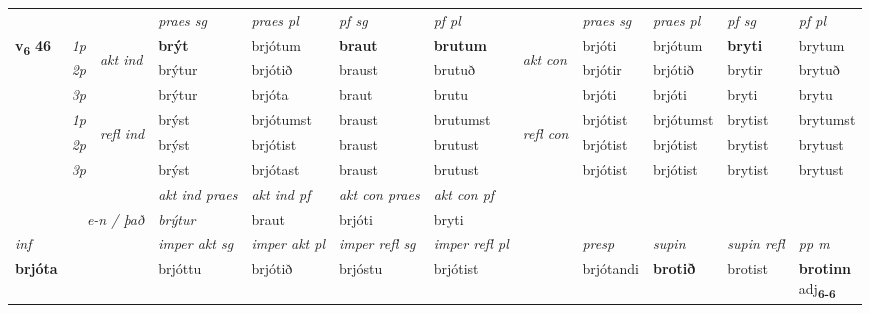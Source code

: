 \begin{longtable}[l]{X>{\footnotesize\itshape}llXXXXlXXXX}
\midrule

 & &   & \textit{praes sg}  & \textit{praes pl}    & \textit{ pf sg} & \textit{pf pl} & & \textit{praes sg}  & \textit{praes pl}    & \textit{pf sg} & \textit{pf pl }  \\ \cmidrule{4-7} \cmidrule{9-12}
 \multirow{2}{*}{{{\textbf{v{\textsubscript{6}}} \Large{\textbf{46}}}}}  & 1p & \multirow{3}{*}{\begin{turn}{90}\textit{akt ind}\end{turn}} & \textbf{brýt} & brjótum & \textbf{braut} & \textbf{brutum} & \multirow{3}{*}{\begin{turn}{90}\textit{akt con}\end{turn}} &brjóti & brjótum & \textbf{bryti} & brytum\\*
 & 2p &  &  brýtur  & brjótið & braust & brutuð & & brjótir & brjótið & brytir & brytuð \\*
 & 3p &  & brýtur & brjóta & braut & brutu & & brjóti & brjóti& bryti & brytu \\*
\cmidrule{4-7} \cmidrule{9-12}
 & 1p & \multirow{3}{*}{\begin{turn}{90}\textit{refl ind}\end{turn}}  & brýst & brjótumst & braust & brutumst & \multirow{3}{*}{\begin{turn}{90}\textit{refl con}\end{turn}}  &brjótist & brjótumst & brytist & brytumst \\*
 & 2p &  & brýst & brjótist & braust & brutust & &brjótist & brjótist & brytist & brytust \\*
 & 3p  & & brýst & brjótast & braust & brutust & & brjótist & brjótist& brytist & brytust \\*
\cmidrule{4-7} \cmidrule{9-12}

   && &  \textit{akt ind praes} & \textit{akt ind pf} & \textit{akt con praes} & \textit{akt con pf} \\*
\multicolumn{3}{r}{\textit{e-n / það}} & brýtur & braut & brjóti & bryti \\*

\cmidrule{4-7}
   {\textit{inf}} & &  & \textit{imper akt sg} & \textit{imper akt pl} & \textit{imper refl sg} & \textit{imper refl pl} && \textit{presp} & \textit{supin} & \textit{supin refl} & \textit{pp m} \\*
  {\textbf{brjóta}} & && brjóttu  & brjótið & brjóstu & brjótist && brjótandi &  \textbf{brotið} & brotist & \specialcell{\textbf{brotinn} \\ adj\textbf{\textsubscript{6-6}}} \\*


\end{longtable}
